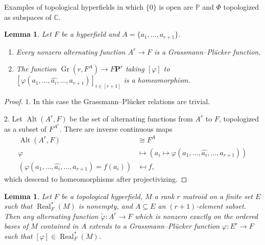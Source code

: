 \documentclass[10pt, preprint]{article}
\newtheorem{lemma}[theorem]{Lemma}
\theoremstyle{definition}
\begin{document}
Examples of topological hyperfields in which $\{0\}$ is open are
$\mathbb{P}$ and $\Phi $ topologized as subspaces of $\mathbb{C}$.

\begin{lemma}
\label{lem:rplus1}
Let $F$ be a hyperfield and $A=\{a_{1}, \ldots , a_{r+1}\}$.
%
\begin{enumerate}[\textit{2.}]%
\item[\textit{1.}]
Every nonzero alternating function $A^{r} \to F$ is a
Grassmann--Pl\"{u}cker function.
%
\item[\textit{2.}]
The function $\operatorname{Gr}(r, F^{A})\to F\mathbf{P}^{r}$ taking
$[\varphi ]$ to $[\varphi (a_{1}, \ldots , \hat{a_{i}}, \ldots , a
_{r+1})]_{ i\in [r+1]}$ is a homeomorphism.
\end{enumerate}
%
\end{lemma}

\begin{proof}
1. In this case the Grassmann--Pl\"{u}cker relations are trivial.

2. Let $\operatorname{Alt}(A^{r},F)$ be the set of alternating functions
from $A^{r}$ to $F$, topologized as a subset of $F^{A^{r}}$. There are
inverse continuous maps
%
\begin{align*}
\operatorname{Alt}(A^{r},F)
& \cong F^{A}
\\
\varphi
& \mapsto (a_{i} \mapsto \varphi (a_{1}, \ldots ,
{\widehat{a_{i}}}, \ldots , a_{r+1}))
\\
(\varphi (a_{1}, \ldots , {\widehat{a_{i}}}, \ldots , a_{r+1}) = f(a
_{i}) )
& \mapsfrom f,
\end{align*}
%
which descend to homeomorphisms after projectivizing.
\end{proof}

\begin{lemma}
\label{lemma:_prescribe}
Let $F$ be a topological hyperfield, $M$ a rank $r$ matroid on a finite
set $E$ such that $\operatorname{Real}_{F}^{*}(M)$ is nonempty, and
$A\subseteq E$ an $(r+1)$-element subset. Then any alternating function
$\tilde{\varphi }:A^{r}\to F$ which is nonzero exactly on the ordered
bases of $M$ contained in $A$ extends to a Grassmann--Pl\"{u}cker
function $\varphi : E^{r}\to F$ such that $[\varphi ]\in
\operatorname{Real}_{F}^{*}(M)$.
\end{lemma}
\end{document}
